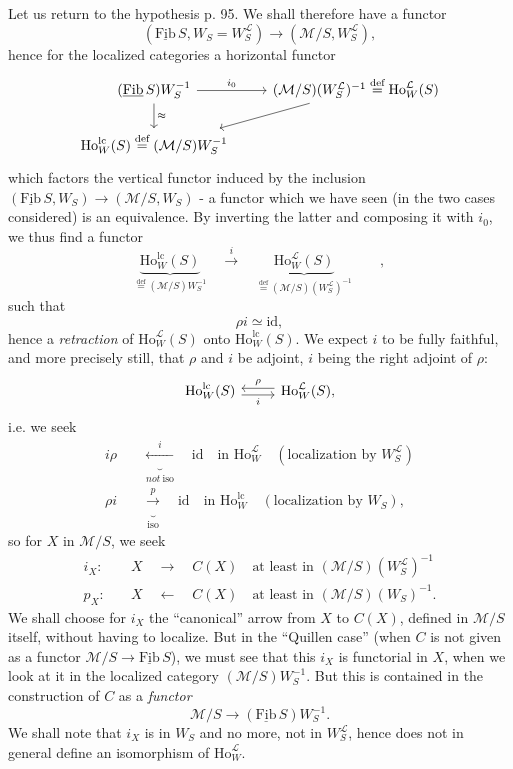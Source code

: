 \documentclass[11pt]{article}
\newcommand{\printedpage}[1]{\marginpar{\footnotesize p.~#1}}
\newcommand{\msp}[1]{\marginpar{\footnotesize [#1]}}
\newcommand{\Fibu}{\underline{\mathrm{Fib}}\,}
\newcommand{\Ho}{\mathrm{Ho}}
\newcommand{\WL}{W_S^{\mathcal{L}}}
\newcommand{\defeq}{\overset{\text{def}}{=}}
\begin{document}
Let us return to the hypothesis p. 95. We shall therefore have a functor
\[
(\Fibu S, W_S = \WL) \longrightarrow (\mathcal{M}/S, \WL),
\]
hence for the localized categories a horizontal functor
\[
\begin{tikzcd}
(\Fibu S)W_S^{-1} \arrow[r, "i_0"] \arrow[d, "\approx"] & (\mathcal{M}/S)(\WL)^{-1} \defeq \Ho_W^{\mathcal{L}}(S) \arrow[dl] \\
\Ho_W^{\mathrm{lc}}(S) \defeq (\mathcal{M}/S)W_S^{-1} &
\end{tikzcd}
\]
which factors the vertical functor induced by the inclusion $(\Fibu S, W_S) \longrightarrow (\mathcal{M}/S, W_S)$ - a functor which we have seen (in the two cases considered) is an equivalence. By inverting the latter and composing it with $i_0$, we thus find a functor
\[
\underbrace{\Ho_W^{\mathrm{lc}}(S)}_{\defeq (\mathcal{M}/S)W_S^{-1}} \quad \xrightarrow{\ i\ } \quad \underbrace{\Ho_W^{\mathcal{L}}(S)}_{\defeq (\mathcal{M}/S)(\WL)^{-1}} \qquad ,
\]
such that
\[
\rho i \simeq \mathrm{id},
\]
hence a \textit{retraction} of $\Ho_W^{\mathcal{L}}(S)$ onto $\Ho_W^{\mathrm{lc}}(S)$. We expect $i$ to be fully faithful, and more precisely still, \msp{page 98} that $\rho$ and $i$ be adjoint, $i$ being the right adjoint of $\rho$:
\[
\begin{tikzcd}
\Ho_W^{\mathrm{lc}}(S) \arrow[r, shift right, "i"'] & \Ho_W^{\mathcal{L}}(S), \arrow[l, shift right, "\rho"']
\end{tikzcd}
\]
\printedpage{62}
i.e. we seek
\[
\begin{aligned}
i\rho &\quad \underbrace{\xleftarrow{\ i\ }}_{\textit{not}\ \text{iso}} \quad \mathrm{id} \quad \text{in } \Ho_W^{\mathcal{L}} \quad (\text{localization by } \WL)\\
\rho i &\quad \underbrace{\xrightarrow{\ p\ }}_{\text{iso}} \quad \mathrm{id} \quad \text{in } \Ho_W^{\mathrm{lc}} \quad (\text{localization by } W_S),
\end{aligned}
\]
 so for $X$ in $\mathcal{M}/S$, we seek
\[
\begin{aligned}
i_X :&\quad X \quad \longrightarrow \quad C(X) \quad \text{at least in } (\mathcal{M}/S)(\WL)^{-1}\\
p_X :&\quad X \quad \longleftarrow \quad C(X) \quad \text{at least in } (\mathcal{M}/S)(W_S)^{-1}.
\end{aligned}
\]
We shall choose for $i_X$ the ``canonical'' arrow from $X$ to $C(X)$, defined in $\mathcal{M}/S$ itself, without having to localize. But in the ``Quillen case'' (when $C$ is not given as a functor $\mathcal{M}/S \longrightarrow \Fibu S$), we must see that this $i_X$ is functorial in $X$, when we look at it in the localized category $(\mathcal{M}/S)W_S^{-1}$. But this is contained in the construction of $C$ as a \textit{functor}
\[
\mathcal{M}/S \longrightarrow (\Fibu S)W_S^{-1}.
\]
We shall note that $i_X$ is in $W_S$ and no more, not in $\WL$, hence does not in general define an isomorphism of $\Ho_W^{\mathcal{L}}$.
\end{document}

